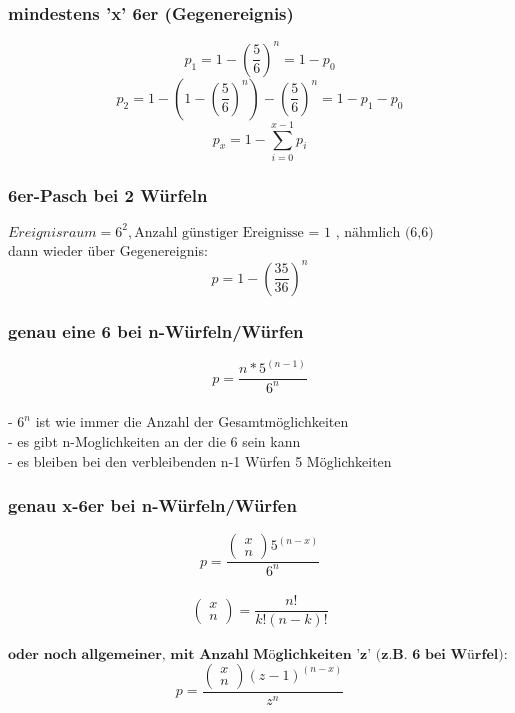 \documentclass{article}
\begin{document}
\subsubsection{mindestens 'x' 6er (Gegenereignis)}
\[	
	p_1 = 1 - \left( \frac{5}{6} \right)^n = 1 - p_0
\]	
\[		
	p_2 = 1-\left(1 - \left( \frac{5}{6} \right)^n\right)-\left( \frac{5}{6} \right)^n = 1-p_1 -p_0
\]
\[
	p_x = 1 - \sum_{i=0}^{x-1} p_i
\]
\subsubsection{6er-Pasch bei 2 W\"urfeln}
$Ereignisraum = 6^2 , \text{Anzahl g\"unstiger Ereignisse = 1 , n\"ahmlich (6,6)}$\\
dann wieder \"uber Gegenereignis: \\
\[ p=1-\left(\frac{35}{36}\right)^n \]
\subsubsection{genau eine 6 bei n-W\"urfeln/W\"urfen}
\[ p= \frac{n*5^{(n-1)}}{6^n}\]\\
- $6^n $ ist wie immer die Anzahl der Gesamtm\"oglichkeiten \\
- es gibt n-Moglichkeiten an der die 6 sein kann \\
- es bleiben bei den verbleibenden n-1 W\"urfen 5 M\"oglichkeiten
\subsubsection{genau x-6er bei n-W\"urfeln/W\"urfen}
\[ p= \frac{\begin{pmatrix}
			x\\n
\end{pmatrix}5^{(n-x)}}{6^n}\]\\
\[\begin{pmatrix}
		x\\n
	\end{pmatrix}= \frac{n!}{k!(n-k)!}
\]\\
$\textbf{oder noch allgemeiner, mit Anzahl M\"oglichkeiten 'z' (z.B. 6 bei W\"urfel):}$\[
	p= \frac{\begin{pmatrix}
			x\\n
	\end{pmatrix}(z-1)^{(n-x)}}{z^n}
\]
\end{document}
